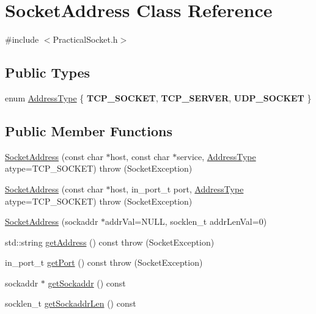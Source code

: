 \hypertarget{class_socket_address}{}\section{Socket\+Address Class Reference}
\label{class_socket_address}


{\ttfamily \#include $<$Practical\+Socket.\+h$>$}

\subsection*{Public Types}
\begin{DoxyCompactItemize}
\item 
enum \hyperlink{class_socket_address_a5a3cef579d48a2f4ea15034da2432e6f}{Address\+Type} \{ {\bfseries T\+C\+P\+\_\+\+S\+O\+C\+K\+ET}, 
{\bfseries T\+C\+P\+\_\+\+S\+E\+R\+V\+ER}, 
{\bfseries U\+D\+P\+\_\+\+S\+O\+C\+K\+ET}
 \}
\end{DoxyCompactItemize}
\subsection*{Public Member Functions}
\begin{DoxyCompactItemize}
\item 
\hyperlink{class_socket_address_a83924a86890d891d2848c7ac3445326c}{Socket\+Address} (const char $\ast$host, const char $\ast$service, \hyperlink{class_socket_address_a5a3cef579d48a2f4ea15034da2432e6f}{Address\+Type} atype=T\+C\+P\+\_\+\+S\+O\+C\+K\+ET)  throw (\+Socket\+Exception)
\item 
\hyperlink{class_socket_address_a9113511e26564133c6ea81b8440a07e7}{Socket\+Address} (const char $\ast$host, in\+\_\+port\+\_\+t port, \hyperlink{class_socket_address_a5a3cef579d48a2f4ea15034da2432e6f}{Address\+Type} atype=T\+C\+P\+\_\+\+S\+O\+C\+K\+ET)  throw (\+Socket\+Exception)
\item 
\hyperlink{class_socket_address_a275b5f83e51662811513139c719d04af}{Socket\+Address} (sockaddr $\ast$addr\+Val=N\+U\+LL, socklen\+\_\+t addr\+Len\+Val=0)
\item 
std\+::string \hyperlink{class_socket_address_a76e48b22389ecf01bfdb64f92b34dbce}{get\+Address} () const   throw (\+Socket\+Exception)
\item 
in\+\_\+port\+\_\+t \hyperlink{class_socket_address_adbeb2faf8caafb61ec19709726d8bdff}{get\+Port} () const   throw (\+Socket\+Exception)
\item 
sockaddr $\ast$ \hyperlink{class_socket_address_af9b5efbbe0223386271f25cdf2a8cdc1}{get\+Sockaddr} () const 
\item 
socklen\+\_\+t \hyperlink{class_socket_address_a6f7a6bd6e2f4776bf8ae2872fde0c2ba}{get\+Sockaddr\+Len} () const 
\end{DoxyCompactItemize}
